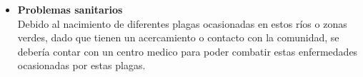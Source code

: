 \begin{enumerate}
\begin{itemize}
		      \item \textbf{Problemas sanitarios}\\
		            Debido al nacimiento de diferentes plagas ocasionadas en estos ríos o zonas verdes, dado que tienen un acercamiento o contacto con la comunidad, se debería contar con un centro medico para poder combatir estas enfermedades ocasionadas por estas plagas.
	      \end{itemize}
\end{enumerate}
